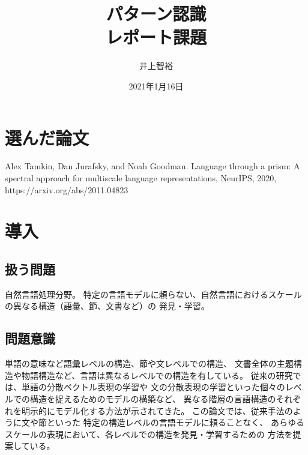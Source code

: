 \documentclass{jsarticle}
\title{\vspace{-3cm}パターン認識\\レポート課題}
\author{井上智裕}
\date{2021年1月16日}
\begin{document}
\maketitle
\vspace{-1cm}
\section{選んだ論文}
Alex Tamkin, Dan Jurafsky, and Noah Goodman. Language through a prism: A spectral approach for multiscale language representations, NeurIPS, 2020, https://arxiv.org/abs/2011.04823

\section{導入}
\subsection{扱う問題}
自然言語処理分野。
特定の言語モデルに頼らない、自然言語におけるスケールの異なる構造（語彙、節、文書など）の
発見・学習。

\subsection{問題意識}
単語の意味など語彙レベルの構造、節や文レベルでの構造、
文書全体の主題構造や物語構造など、言語は異なるレベルでの構造を有している。
従来の研究では、単語の分散ベクトル表現の学習\cite{mikolov2013distributed}や
文の分散表現の学習\cite{hill-etal-2016-learning-distributed}といった個々のレベルでの構造を捉えるためのモデルの構築など、
異なる階層の言語構造のそれぞれを明示的にモデル化する方法が示されてきた。
この論文では、従来手法のように文や節といった
特定の構造レベルの言語モデルに頼ることなく、
あらゆるスケールの表現において、各レベルでの構造を発見・学習するための
方法を提案している。
\end{document}
